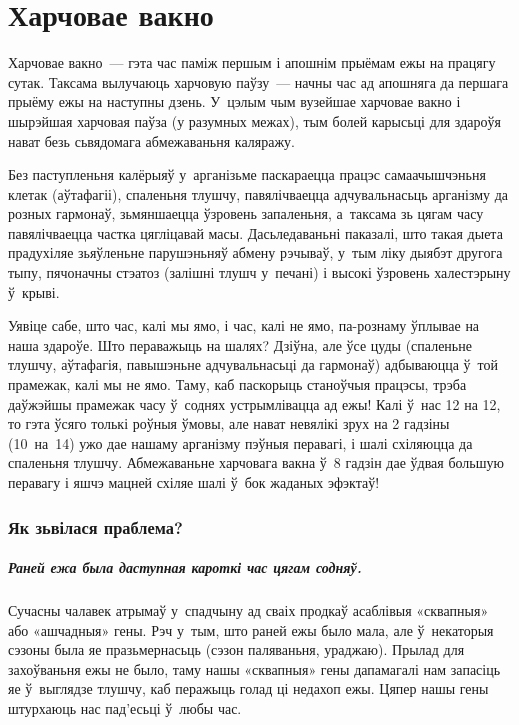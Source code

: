 \chapter{Харчовае вакно}

Харчовае вакно~--- гэта час паміж першым і апошнім прыёмам ежы на працягу сутак. Таксама вылучаюць харчовую паўзу~--- начны час ад апошняга да першага прыёму ежы на наступны дзень. У~цэлым чым вузейшае харчовае вакно і шырэйшая харчовая паўза (у разумных межах), тым болей карысьці для здароўя нават безь сьвядомага абмежаваньня каляражу. 

Без паступленьня калёрыяў у~арганізьме паскараецца працэс самаачышчэньня клетак (аўтафагіі), спаленьня тлушчу, павялічваецца адчувальнасьць арганізму да розных гармонаў, зьмяншаецца ўзровень запаленьня, а~таксама зь цягам часу павялічваецца частка цягліцавай масы. Дасьледаваньні паказалі, што такая дыета прадухіляе зьяўленьне парушэньняў абмену рэчываў, у~тым ліку дыябэт другога тыпу, пячоначны стэатоз (залішні тлушч у~печані) і высокі ўзровень халестэрыну ў~крыві.


Уявіце сабе, што час, калі мы ямо, і час, калі не ямо, па-рознаму ўплывае на наша здароўе. Што пераважыць на шалях? Дзіўна, але ўсе цуды (спаленьне тлушчу, аўтафагія, павышэньне адчувальнасьці да гармонаў) адбываюцца ў~той прамежак, калі мы не ямо. Таму, каб паскорыць станоўчыя працэсы, трэба даўжэйшы прамежак часу ў~соднях устрымлівацца ад ежы! Калі ў~нас 12 на 12, то гэта ўсяго толькі роўныя ўмовы, але нават невялікі зрух на 2 гадзіны (10~на~14) ужо дае нашаму арганізму пэўныя перавагі, і шалі схіляюцца да спаленьня тлушчу. Абмежаваньне харчовага вакна ў~8 гадзін дае ўдвая большую перавагу і яшчэ мацней схіляе шалі ў~бок жаданых эфэктаў!

\subsection{Як зьвілася праблема?}

\paragraph{Раней ежа была даступная кароткі час цягам содняў.}

Сучасны чалавек атрымаў у~спадчыну ад сваіх продкаў асаблівыя «сквапныя» або «ашчадныя» гены. Рэч у~тым, што раней ежы было мала, але ў~некаторыя сэзоны была яе празьмернасьць (сэзон паляваньня, ураджаю). Прылад для захоўваньня ежы не было, таму нашы «сквапныя» гены дапамагалі нам запасіць яе ў~выглядзе тлушчу, каб перажыць голад ці недахоп ежы. Цяпер нашы гены штурхаюць нас пад'есьці ў~любы час.

